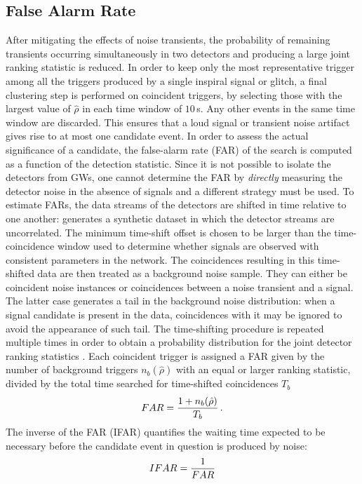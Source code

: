 \documentclass[binding=0.6cm, LaM]{sapthesis}
\begin{document}
\subsection{False Alarm Rate}
\label{subsec:far}
	After mitigating the effects of noise transients, the probability of remaining transients 
	occurring simultaneously in two detectors and producing a large joint 
	ranking statistic is reduced.
	In order to keep only the most representative trigger among all the triggers produced by a single inspiral signal or glitch, 
	a final clustering step is performed on coincident triggers, 
	by selecting those with the largest value of $\hat \rho$ 
	in each time window of $10$\,s. 
	Any other events in the same time window are discarded. 
	This ensures that a loud signal or transient noise artifact gives rise to at most one candidate event.
	In order to assess the actual significance of a candidate, 
	the false-alarm rate (FAR) of the search is computed as a function of the detection statistic.
  	Since it is not possible to isolate the detectors from GWs, 
	one cannot determine the FAR by \emph{directly} measuring the detector noise in the absence 
	of signals and a different strategy must be used.
 	To estimate FARs, the data streams of the detectors are shifted in time relative to one another: 
	generates a synthetic dataset in which the detector streams are uncorrelated.
	The minimum time-shift offset is chosen to be larger than the time-coincidence window 
	used to determine whether signals are observed with consistent parameters in the network.
	The coincidences resulting in this time-shifted data are then treated as a background noise sample.
	They can either be coincident noise instances or coincidences between a noise transient and a signal.
	The latter case generates a tail in the background noise distribution: 
	when a signal candidate is present in the data, coincidences with it 
	may be ignored to avoid the appearance of such tail.
	The time-shifting procedure is repeated multiple times in order to obtain a probability distribution 
	for the joint detector ranking statistics \cite{44}. 
	Each coincident trigger is assigned a FAR given by the number 
	of background triggers $n_b(\hat \rho)$ with an equal or larger ranking statistic, 
	divided by the total time searched for time-shifted coincidences $T_b$
        \begin{equation}
          FAR = {{1 + n_b(\hat \rho)} \over {T_b}}\,.
        \end{equation}
        The inverse of the FAR (IFAR) quantifies the waiting time expected to be necessary 
	before the candidate event in question is produced by noise:
        \begin{equation}
          IFAR = {1 \over {FAR}}
        \end{equation}
\end{document}
